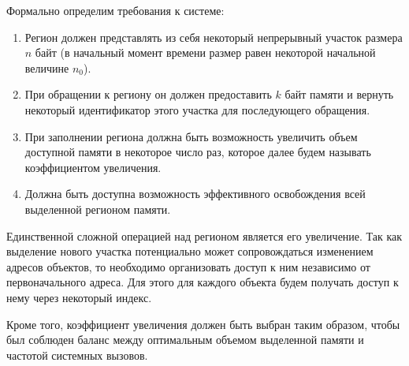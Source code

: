 Формально определим требования к системе:
\begin{enumerate}
    \item Регион должен представлять из себя некоторый непрерывный участок
    размера $n$ байт (в начальный момент времени размер равен некоторой
    начальной величине $n_0$).
    \item При обращении к региону он должен предоставить $k$ байт памяти и
    вернуть некоторый идентификатор этого участка для последующего обращения.
    \item При заполнении региона должна быть возможность увеличить объем
    доступной памяти в некоторое число раз, которое далее будем называть
    коэффициентом увеличения.
    \item Должна быть доступна возможность эффективного освобождения всей
    выделенной регионом памяти.
\end{enumerate}

Единственной сложной операцией над регионом является его увеличение.
Так как выделение нового участка потенциально может сопровождаться изменением
адресов объектов, то необходимо организовать доступ к ним независимо
от первоначального адреса. Для этого для каждого объекта будем получать
доступ к нему через некоторый индекс.

Кроме того, коэффициент увеличения должен быть выбран таким образом, чтобы был
соблюден баланс между оптимальным объемом выделенной
памяти и частотой системных вызовов.
